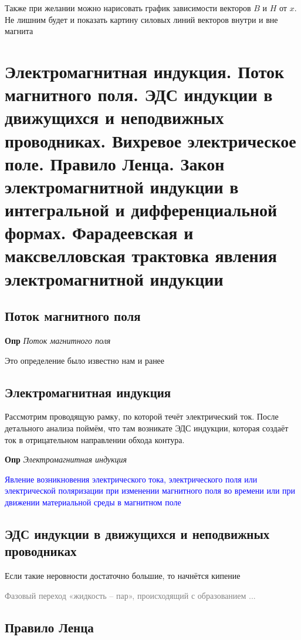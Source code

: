 \documentclass[a4paper, 14pt]{article}
\begin{document}
    Также при желании можно нарисовать график зависимости векторов $B$ и $H$ от $x$.
    Не лишним будет и показать картину силовых линий векторов внутри и вне магнита
    
    \section{Электромагнитная индукция.
    Поток магнитного поля.
    ЭДС индукции в движущихся и неподвижных проводниках.
    Вихревое электрическое поле.
    Правило Ленца.
    Закон электромагнитной индукции в интегральной и дифференциальной формах.
    Фарадеевская и максвелловская трактовка явления электромагнитной индукции}
    
    \subsection{Поток магнитного поля}
    
    \textbf{Опр} \textit{Поток магнитного поля}
    
    Это определение было известно нам и ранее
    
    \subsection{Электромагнитная индукция}
    
    Рассмотрим проводящую рамку, по которой течёт электрический ток.
    После детального анализа поймём, что там возникате ЭДС индукции, которая создаёт ток в отрицательном направлении
    обхода контура.
    
    \textbf{Опр} \textit{Электромагнитная индукция}
    
    \textcolor{blue}{Явление возникновения электрического тока, электрического поля или электрической поляризации при
    изменении магнитного поля во времени или при движении материальной среды в магнитном поле}
    
    \subsection{ЭДС индукции в движущихся и неподвижных проводниках}
    
    Если такие неровности достаточно большие, то начнётся кипение
    
    \textcolor{gray}{Фазовый переход «жидкость -- пар», происходящий с образованием ...}
    
    \subsection{Правило Ленца}
    
\end{document}
